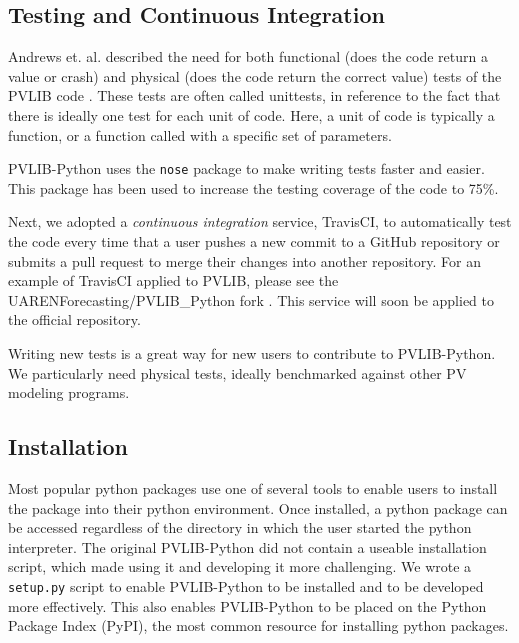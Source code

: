 \documentclass[conference]{IEEEtran}
\begin{document}
\subsection{Testing and Continuous Integration}

Andrews et. al. described the need for both functional (does the code return a value or crash) and physical (does the code return the correct value) tests of the PVLIB code \cite{andrews}.
These tests are often called unittests, in reference to the fact that there is ideally one test for each unit of code.
Here, a unit of code is typically a function, or a function called with a specific set of parameters.

PVLIB-Python uses the \texttt{nose} package \cite{nosetests} to make writing tests faster and easier. This package has been used to increase the testing coverage of the code to 75\%.

Next, we adopted a \emph{continuous integration} service, TravisCI, to automatically test the code every time that a user pushes a new commit to a GitHub repository or submits a pull request to merge their changes into another repository. 
For an example of TravisCI applied to PVLIB, please see the UARENForecasting/PVLIB{\_}Python fork \cite{uaren-pvlib}.
This service will soon be applied to the official repository.

Writing new tests is a great way for new users to contribute to PVLIB-Python. We particularly need physical tests, ideally benchmarked against other PV modeling programs.


\subsection{Installation}

Most popular python packages use one of several tools to enable users to install the package into their python environment.
Once installed, a python package can be accessed regardless of the directory in which the user started the python interpreter.
The original PVLIB-Python did not contain a useable installation script, which made using it and developing it more challenging.
We wrote a \texttt{setup.py} script to enable PVLIB-Python to be installed and to be developed more effectively.
This also enables PVLIB-Python to be placed on the Python Package Index (PyPI), the most common resource for installing python packages.


\end{document}
